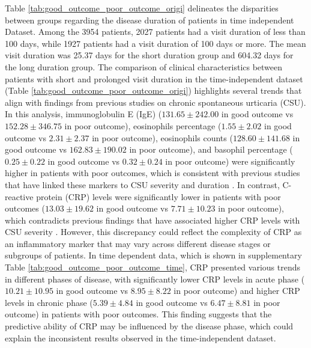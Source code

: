 \documentclass[final,3p,times,authoryear]{elsarticle}
\begin{document}
Table \ref{tab:good_outcome_poor_outcome_origi} delineates the disparities between groups regarding the disease duration of patients in time independent Dataset. Among the 3954 patients, 2027 patients had a visit duration of less than 100 days, while 1927 patients had a visit duration of 100 days or more. The mean visit duration was 25.37 days for the short duration group and 604.32 days for the long duration group. The comparison of clinical characteristics between patients with short and prolonged visit duration in the time-independent dataset (Table \ref{tab:good_outcome_poor_outcome_origi}) highlights several trends that align with findings from previous studies on chronic spontaneous urticaria (CSU). In this analysis, immunoglobulin E (IgE) ($131.65 \pm 242.00$ in good outcome vs $152.28 \pm 346.75$ in poor outcome), eosinophils percentage ($1.55 \pm 2.02$ in good outcome vs $2.31 \pm 2.37$ in poor outcome), eosinophils counts ($128.60 \pm 141.68$ in good outcome vs $162.83 \pm 190.02$ in poor outcome), and basophil percentage ($0.25 \pm 0.22$ in good outcome vs $0.32 \pm 0.24$ in poor outcome) were significantly higher in patients with poor outcomes, which is consistent with previous studies that have linked these markers to CSU severity and duration \citep{SanchezBorges2017Factors,Rabelo-Filardi2013Parameters, Kolkhir2019Eosinopenia}. In contrast, C-reactive protein (CRP) levels were significantly lower in patients with poor outcomes ($13.03 \pm 19.62$ in good outcome vs $7.71 \pm 10.23$ in poor outcome), which contradicts previous findings that have associated higher CRP levels with CSU severity \citep{Rabelo-Filardi2013Parameters}. However, this discrepancy could reflect the complexity of CRP as an inflammatory marker that may vary across different disease stages or subgroups of patients. In time dependent data, which is shown in supplementary Table \ref{tab:good_outcome_poor_outcome_time}, CRP presented various trends in different phases of disease, with significantly lower CRP levels in acute phase ($10.21 \pm 10.95$ in good outcome vs $8.95 \pm 8.22$ in poor outcome) and higher CRP levels in chronic phase ($5.39 \pm 4.84$ in good outcome vs $6.47 \pm 8.81$ in poor outcome) in patients with poor outcomes. This finding suggests that the predictive ability of CRP may be influenced by the disease phase, which could explain the inconsistent results observed in the time-independent dataset.
\end{document}
